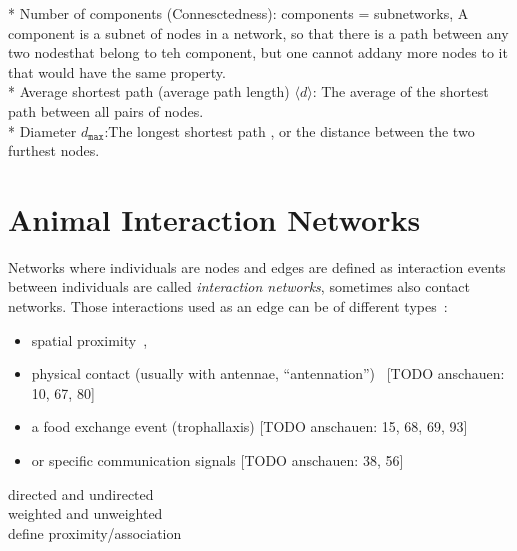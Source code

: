 * Number of components (Connesctedness): components = subnetworks, A component is a subnet of nodes in a network, so that there is a path between any two nodesthat belong to teh component, but one cannot addany more nodes to it that would have the same property.\\

* Average shortest path (average path length) $\langle d \rangle$: The average of the shortest path between all pairs of nodes.\\

* Diameter $d_{\texttt{max}}$:The longest shortest path , or the distance between the two furthest nodes.\\



\section{Animal Interaction Networks}

Networks where individuals are nodes and edges are defined as interaction events between individuals are called \emph{interaction networks}, sometimes also contact networks. 
Those interactions used as an edge can be of different types~\cite{charbonneau2013social}:

\begin{itemize}
\item spatial proximity~\cite{jeanson2012long, otterstatter2007contact},
\item physical contact (usually with antennae, “antennation”)~\cite{mersch2013tracking} [TODO anschauen: 10, 67, 80]
\item a food exchange event (trophallaxis) [TODO anschauen: 15, 68, 69, 93]
\item or specific communication signals [TODO anschauen: 38, 56]
\end{itemize}

directed and undirected\\
weighted and unweighted\\

define proximity/association\\


